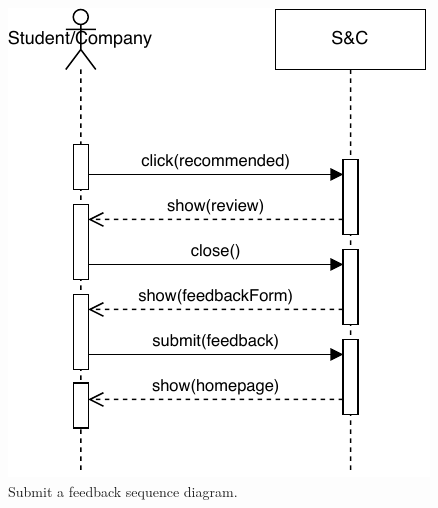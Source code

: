 \begin{figure}[H]
    \begin{center}
        \includegraphics[width=\linewidth, keepaspectratio]{Images/SequenceDiagram/SubmitFeedbackSD.pdf}
        \caption{Submit a feedback sequence diagram.}
        \label{fig:submit_a_feedback_seqdiag}%
    \end{center}
\end{figure}



